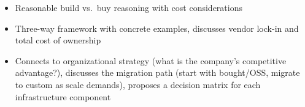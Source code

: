 \begin{interviewq}

\goodgreat
\begin{itemize}
    \item {} Reasonable build vs.\ buy reasoning with cost considerations
    \item {} Three-way framework with concrete examples, discusses vendor lock-in and total cost of ownership
    \item {} Connects to organizational strategy (what is the company's competitive advantage?), discusses the migration path (start with bought/OSS, migrate to custom as scale demands), proposes a decision matrix for each infrastructure component
\end{itemize}

\end{interviewq}

